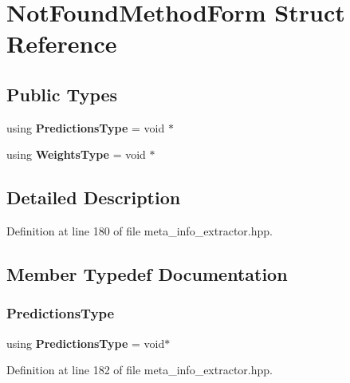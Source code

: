 \section{Not\+Found\+Method\+Form Struct Reference}
\label{structmlpack_1_1cv_1_1NotFoundMethodForm}
\subsection*{Public Types}
\begin{DoxyCompactItemize}
\item 
using \textbf{ Predictions\+Type} = void $\ast$
\item 
using \textbf{ Weights\+Type} = void $\ast$
\end{DoxyCompactItemize}


\subsection{Detailed Description}


Definition at line 180 of file meta\+\_\+info\+\_\+extractor.\+hpp.



\subsection{Member Typedef Documentation}
\mbox{\label{structmlpack_1_1cv_1_1NotFoundMethodForm_a384f9c7eec2544d51529053885f53626}} 
\subsubsection{Predictions\+Type}
{\footnotesize\ttfamily using \textbf{ Predictions\+Type} =  void$\ast$}



Definition at line 182 of file meta\+\_\+info\+\_\+extractor.\+hpp.

\mbox{\label{structmlpack_1_1cv_1_1NotFoundMethodForm_ac81205dde90dbe196554aa8c00287aad}} 
